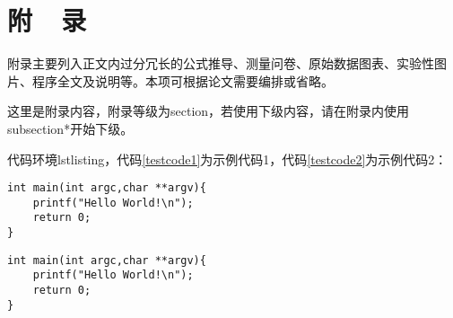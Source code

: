 \newpage
{}
{}
\section*{附~~录}
\vspace*{-2mm}
\setlength{\baselineskip}{25pt}
附录主要列入正文内过分冗长的公式推导、测量问卷、原始数据图表、实验性图片、程序全文及说明等。本项可根据论文需要编排或省略。

这里是附录内容，附录等级为section，若使用下级内容，请在附录内使用subsection*开始下级。

代码环境lstlisting，代码\ref{testcode1}为示例代码1，代码\ref{testcode2}为示例代码2：
\begin{lstlisting}[caption={代码示例1\label{testcode1}}]
int main(int argc,char **argv){
	printf("Hello World!\n");
	return 0;
}
\end{lstlisting}
\begin{lstlisting}[caption={代码示例2\label{testcode2}}]
int main(int argc,char **argv){
	printf("Hello World!\n");
	return 0;
}
\end{lstlisting}

\label{appendix}  %